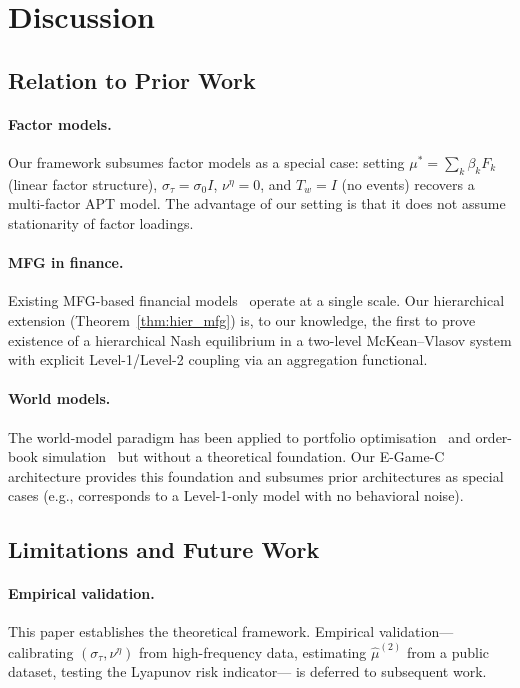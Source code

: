 \documentclass[12pt,a4paper]{article}
\theoremstyle{plain}
\theoremstyle{definition}
\newcommand{\1}{\mathbbm{1}}
\begin{document}
\section{Discussion}
\label{sec:discussion}

\subsection{Relation to Prior Work}

\paragraph{Factor models.}
Our framework subsumes factor models as a special case: setting $\mu^* = \sum_k \beta_k F_k$ (linear factor structure), $\sigma_\tau = \sigma_0 I$, $\nu^\eta = 0$, and $T_w = I$ (no events) recovers a multi-factor APT model. The advantage of our setting is that it does not assume stationarity of factor loadings.

\paragraph{MFG in finance.}
Existing MFG-based financial models~\citep{CarmonaLacker2015,CarmonaMouzouni2023}
operate at a single scale.  Our hierarchical extension (Theorem~\ref{thm:hier_mfg})
is, to our knowledge, the first to prove existence of a hierarchical Nash
equilibrium in a two-level McKean--Vlasov system with explicit Level-1/Level-2
coupling via an aggregation functional.

\paragraph{World models.}
The world-model paradigm has been applied to portfolio
optimisation~\citep{AwmlgLiverpool2026} and order-book
simulation~\citep{MorganJPMaGAN} but without a theoretical foundation.
Our E-Game-C architecture provides this foundation and subsumes prior
architectures as special cases (e.g., \citet{HaSchmidhuber2018} corresponds to
a Level-1-only model with no behavioral noise).

\subsection{Limitations and Future Work}

\paragraph{Empirical validation.}
This paper establishes the theoretical framework. Empirical validation—
calibrating $(\sigma_\tau, \nu^\eta)$ from high-frequency data, estimating
$\hat\mu^{(2)}$ from a public dataset, testing the Lyapunov risk indicator—
is deferred to subsequent work.
\end{document}
